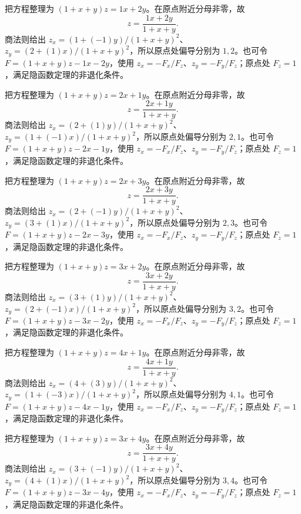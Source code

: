 \documentclass[UTF8,12pt,a4paper,fontset=fandol]{ctexart}
\begin{document}
\begin{solve}\label{ans:c33q13}
把方程整理为 $(1+x+y)z=1x+2y$。在原点附近分母非零，故
\[
z=\frac{1x+2y}{1+x+y}.
\]
商法则给出 $z_x=(1+(-1)y)/(1+x+y)^2$、$z_y=(2+(1)x)/(1+x+y)^2$，所以原点处偏导分别为 $1,2$。也可令 $F=(1+x+y)z-1x-2y$，使用 $z_x=-F_x/F_z$、$z_y=-F_y/F_z$；原点处 $F_z=1$，满足隐函数定理的非退化条件。
\end{solve}

\begin{solve}\label{ans:c33q14}
把方程整理为 $(1+x+y)z=2x+1y$。在原点附近分母非零，故
\[
z=\frac{2x+1y}{1+x+y}.
\]
商法则给出 $z_x=(2+(1)y)/(1+x+y)^2$、$z_y=(1+(-1)x)/(1+x+y)^2$，所以原点处偏导分别为 $2,1$。也可令 $F=(1+x+y)z-2x-1y$，使用 $z_x=-F_x/F_z$、$z_y=-F_y/F_z$；原点处 $F_z=1$，满足隐函数定理的非退化条件。
\end{solve}

\begin{solve}\label{ans:c33q15}
把方程整理为 $(1+x+y)z=2x+3y$。在原点附近分母非零，故
\[
z=\frac{2x+3y}{1+x+y}.
\]
商法则给出 $z_x=(2+(-1)y)/(1+x+y)^2$、$z_y=(3+(1)x)/(1+x+y)^2$，所以原点处偏导分别为 $2,3$。也可令 $F=(1+x+y)z-2x-3y$，使用 $z_x=-F_x/F_z$、$z_y=-F_y/F_z$；原点处 $F_z=1$，满足隐函数定理的非退化条件。
\end{solve}

\begin{solve}\label{ans:c33q16}
把方程整理为 $(1+x+y)z=3x+2y$。在原点附近分母非零，故
\[
z=\frac{3x+2y}{1+x+y}.
\]
商法则给出 $z_x=(3+(1)y)/(1+x+y)^2$、$z_y=(2+(-1)x)/(1+x+y)^2$，所以原点处偏导分别为 $3,2$。也可令 $F=(1+x+y)z-3x-2y$，使用 $z_x=-F_x/F_z$、$z_y=-F_y/F_z$；原点处 $F_z=1$，满足隐函数定理的非退化条件。
\end{solve}

\begin{solve}\label{ans:c33q17}
把方程整理为 $(1+x+y)z=4x+1y$。在原点附近分母非零，故
\[
z=\frac{4x+1y}{1+x+y}.
\]
商法则给出 $z_x=(4+(3)y)/(1+x+y)^2$、$z_y=(1+(-3)x)/(1+x+y)^2$，所以原点处偏导分别为 $4,1$。也可令 $F=(1+x+y)z-4x-1y$，使用 $z_x=-F_x/F_z$、$z_y=-F_y/F_z$；原点处 $F_z=1$，满足隐函数定理的非退化条件。
\end{solve}

\begin{solve}\label{ans:c33q18}
把方程整理为 $(1+x+y)z=3x+4y$。在原点附近分母非零，故
\[
z=\frac{3x+4y}{1+x+y}.
\]
商法则给出 $z_x=(3+(-1)y)/(1+x+y)^2$、$z_y=(4+(1)x)/(1+x+y)^2$，所以原点处偏导分别为 $3,4$。也可令 $F=(1+x+y)z-3x-4y$，使用 $z_x=-F_x/F_z$、$z_y=-F_y/F_z$；原点处 $F_z=1$，满足隐函数定理的非退化条件。
\end{solve}
\end{document}
